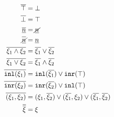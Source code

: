 \begin{subequations}\label{defn:dual}
\begin{align*}
  \cdual{\ctruth} &= \cfalsity \\
  \cdual{\cfalsity} &= \ctruth \\
  \cdual{\cnum{n}} &= \cnotnum{n} \\
  \cdual{\cnotnum{n}} &= \cnum{n} \\
  \cdual{\cand{\xi_1}{\xi_2}} &= \cor{\cdual{\xi_1}}{\cdual{\xi_2}} \\
  \cdual{\cor{\xi_1}{\xi_2}} &= \cand{\cdual{\xi_1}}{\cdual{\xi_2}} \\
  \cdual{\cinl{\xi_1}} &= \cor{ \cinl{\cdual{\xi_1}} }{ \cinr{\ctruth} } \\
  \cdual{\cinr{\xi_2}} &= \cor{ \cinr{\cdual{\xi_2}} }{ \cinl{\ctruth} } \\
  \cdual{\cpair{\xi_1}{\xi_2}} &=
  \cor{ \cor{ 
    \cpair{\xi_1}{\cdual{\xi_2}}
  }{
    \cpair{\cdual{\xi_1}}{\xi_2}
  }}{
    \cpair{\cdual{\xi_1}}{\cdual{\xi_2}}
  } \\
  \cdual{\cdual{\xi}} &= \xi
\end{align*}
\end{subequations}

